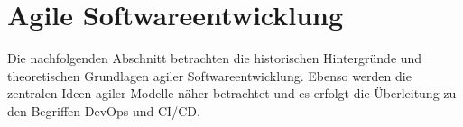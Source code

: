 \section{Agile Softwareentwicklung}
\label{Agile Softwareentwicklung}
Die nachfolgenden Abschnitt betrachten die historischen Hintergründe und theoretischen Grundlagen agiler Softwareentwicklung. Ebenso werden die zentralen Ideen agiler Modelle näher betrachtet und es erfolgt die Überleitung zu den Begriffen \acrshort{DevOps} und \acrshort{CI}/\acrshort{CD}.   